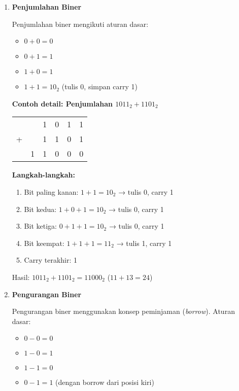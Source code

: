 \documentclass[../main.tex]{subfiles}
\begin{document}
\begin{enumerate}
\item \textbf{Penjumlahan Biner}

Penjumlahan biner mengikuti aturan dasar:
\begin{itemize}
    \item \(0 + 0 = 0\)
    \item \(0 + 1 = 1\)
    \item \(1 + 0 = 1\)
    \item \(1 + 1 = 10_2\) (tulis 0, simpan carry 1)
\end{itemize}

\textbf{Contoh detail: Penjumlahan \(1011_2 + 1101_2\)}

\begin{center}
\begin{tabular}{cccccc}
  &   & 1 & 0 & 1 & 1 \\
+ &   & 1 & 1 & 0 & 1 \\
\hline
  & 1 & 1 & 0 & 0 & 0 \\
\end{tabular}
\end{center}

\textbf{Langkah-langkah:}
\begin{enumerate}
    \item Bit paling kanan: \(1 + 1 = 10_2\) → tulis 0, carry 1
    \item Bit kedua: \(1 + 0 + 1 = 10_2\) → tulis 0, carry 1
    \item Bit ketiga: \(0 + 1 + 1 = 10_2\) → tulis 0, carry 1
    \item Bit keempat: \(1 + 1 + 1 = 11_2\) → tulis 1, carry 1
    \item Carry terakhir: 1
\end{enumerate}

Hasil: \(1011_2 + 1101_2 = 11000_2\) (\(11 + 13 = 24\))

\item \textbf{Pengurangan Biner}

Pengurangan biner menggunakan konsep peminjaman (\textit{borrow}). Aturan dasar:
\begin{itemize}
    \item \(0 - 0 = 0\)
    \item \(1 - 0 = 1\)
    \item \(1 - 1 = 0\)
    \item \(0 - 1 = 1\) (dengan borrow dari posisi kiri)
\end{itemize}


\end{enumerate}
\end{document}
